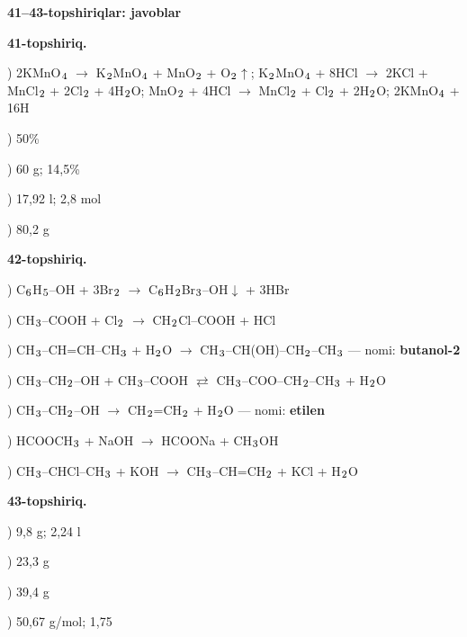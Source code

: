 \documentclass[11pt,a4paper]{article}
\renewcommand{\textsubscript}[1]{\ensuremath{_{\text{\fontsize{8}{8}\selectfont #1}}}}
\begin{document}
\noindent\textbf{41--43-topshiriqlar: javoblar}\par\smallskip
\noindent\textbf{41-topshiriq.}\par
{}) 2KMnO\textsubscript{4} $\to$ K\textsubscript{2}MnO\textsubscript{4} + MnO\textsubscript{2} + O\textsubscript{2}$\uparrow$; K\textsubscript{2}MnO\textsubscript{4} + 8HCl $\to$ 2KCl + MnCl\textsubscript{2} + 2Cl\textsubscript{2} + 4H\textsubscript{2}O; MnO\textsubscript{2} + 4HCl $\to$ MnCl\textsubscript{2} + Cl\textsubscript{2} + 2H\textsubscript{2}O; 2KMnO\textsubscript{4} + 16H\par
{}) 50\%\par
{}) 60 g; 14,5\%\par
{}) 17,92 l; 2,8 mol\par
{}) 80,2 g\par
\noindent\textbf{42-topshiriq.}\par
{}) C\textsubscript{6}H\textsubscript{5}--OH + 3Br\textsubscript{2} $\to$ C\textsubscript{6}H\textsubscript{2}Br\textsubscript{3}--OH$\downarrow$ + 3HBr\par
{}) CH\textsubscript{3}--COOH + Cl\textsubscript{2} $\to$ CH\textsubscript{2}Cl--COOH + HCl\par
{}) CH\textsubscript{3}--CH=CH--CH\textsubscript{3} + H\textsubscript{2}O $\to$ CH\textsubscript{3}--CH(OH)--CH\textsubscript{2}--CH\textsubscript{3} --- nomi: \textbf{butanol-2}\par
{}) CH\textsubscript{3}--CH\textsubscript{2}--OH + CH\textsubscript{3}--COOH $\rightleftarrows$ CH\textsubscript{3}--COO--CH\textsubscript{2}--CH\textsubscript{3} + H\textsubscript{2}O\par
{}) CH\textsubscript{3}--CH\textsubscript{2}--OH $\to$ CH\textsubscript{2}=CH\textsubscript{2} + H\textsubscript{2}O --- nomi: \textbf{etilen}\par
{}) HCOOCH\textsubscript{3} + NaOH $\to$ HCOONa + CH\textsubscript{3}OH\par
{}) CH\textsubscript{3}--CHCl--CH\textsubscript{3} + KOH $\to$ CH\textsubscript{3}--CH=CH\textsubscript{2} + KCl + H\textsubscript{2}O\par
\noindent\textbf{43-topshiriq.}\par
{}) 9,8 g; 2,24 l\par
{}) 23,3 g\par
{}) 39,4 g\par
{}) 50,67 g/mol; 1,75\par
\end{document}
